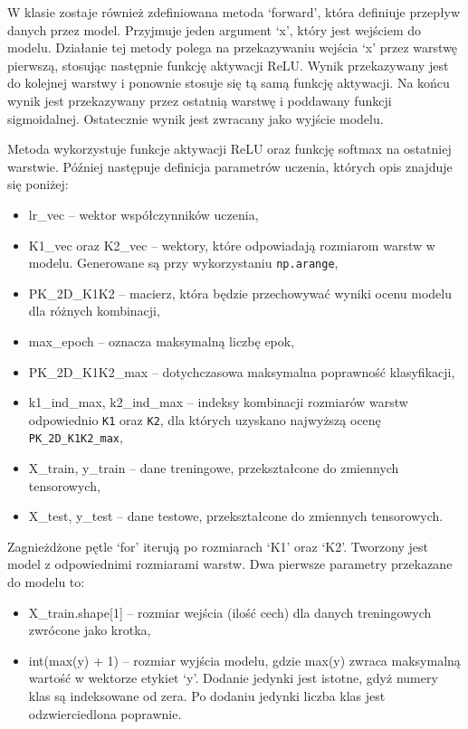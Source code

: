 \documentclass[a4paper]{article}
\begin{document}
W klasie zostaje również zdefiniowana metoda `forward', która definiuje przepływ danych przez model.
Przyjmuje jeden argument `x', który jest wejściem do modelu.
Działanie tej metody polega na przekazywaniu wejścia `x' przez warstwę pierwszą, stosując następnie funkcję aktywacji ReLU.
Wynik przekazywany jest do kolejnej warstwy i ponownie stosuje się tą samą funkcję aktywacji.
Na końcu wynik jest przekazywany przez ostatnią warstwę i poddawany funkcji sigmoidalnej.
Ostatecznie wynik jest zwracany jako wyjście modelu.

Metoda wykorzystuje funkcje aktywacji ReLU oraz funkcję softmax na ostatniej warstwie.
Później następuje definicja parametrów uczenia, których opis znajduje się poniżej:
\begin{itemize}
    \item lr\_vec -- wektor współczynników uczenia,
    \item K1\_vec oraz K2\_vec -- wektory, które odpowiadają rozmiarom warstw w modelu. Generowane są przy wykorzystaniu \texttt{np.arange},
    \item PK\_2D\_K1K2 -- macierz, która będzie przechowywać wyniki ocenu modelu dla różnych kombinacji,
    \item max\_epoch -- oznacza maksymalną liczbę epok,
    \item PK\_2D\_K1K2\_max -- dotychczasowa maksymalna poprawność klasyfikacji,
    \item k1\_ind\_max, k2\_ind\_max -- indeksy kombinacji rozmiarów warstw odpowiednio \texttt{K1} oraz \texttt{K2}, dla których uzyskano najwyższą ocenę \texttt{PK\_2D\_K1K2\_max},
    \item X\_train, y\_train -- dane treningowe, przekształcone do zmiennych tensorowych,
    \item X\_test, y\_test -- dane testowe, przekształcone do zmiennych tensorowych.
\end{itemize}

Zagnieżdżone pętle `for' iterują po rozmiarach `K1' oraz `K2'.
Tworzony jest model z odpowiednimi rozmiarami warstw.
Dwa pierwsze parametry przekazane do modelu to:
\begin{itemize}
    \item X\_train.shape[1] -- rozmiar wejścia (ilość cech) dla danych treningowych zwrócone jako krotka,
    \item int(max(y) + 1) -- rozmiar wyjścia modelu, gdzie max(y) zwraca maksymalną wartość w wektorze etykiet `y'. Dodanie jedynki jest istotne, gdyż numery klas są indeksowane od zera. Po dodaniu jedynki liczba klas jest odzwierciedlona poprawnie.
\end{itemize}
\end{document}
